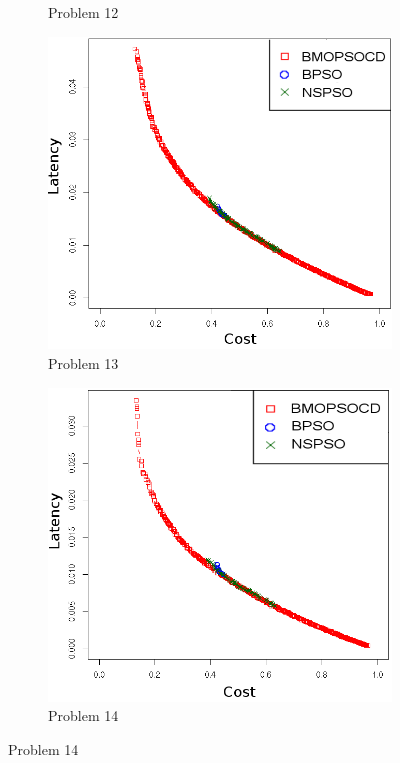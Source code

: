 \begin{figure}[]
\begin{subfigure}{0.30\textwidth}
	   \caption{Problem 12}
   \end{subfigure}
      \begin{subfigure}{0.30\textwidth}
       \includegraphics[width=\textwidth]{pics/total13.png}
	   \caption{Problem 13}
   \end{subfigure}
      \begin{subfigure}{0.30\textwidth}
       \includegraphics[width=\textwidth]{pics/total14.png}
	   \caption{Problem 14}
   \end{subfigure}
   \label{fig:total}
\end{figure}

